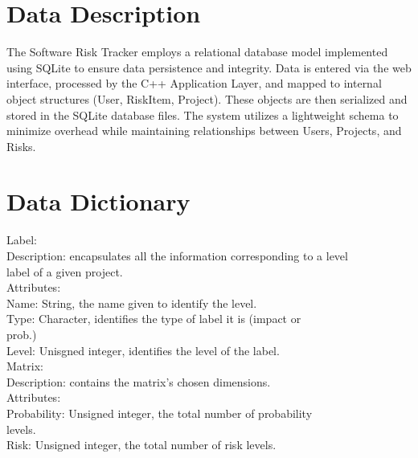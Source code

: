 \documentclass[letterpaper,12pt,oneside,listof=totoc,parskip=full]{scrreprt}
\begin{document}
\section{Data Description}

The Software Risk Tracker employs a relational database model implemented using SQLite to ensure data persistence and integrity. Data is entered via the web interface, processed by the C++ Application Layer, and mapped to internal object structures (User, RiskItem, Project). These objects are then serialized and stored in the SQLite database files. The system utilizes a lightweight schema to minimize overhead while maintaining relationships between Users, Projects, and Risks.

\section{Data Dictionary}


Label: \\
\hspace* {1cm} Description: encapsulates all the information corresponding to a level \\
\hspace*{1cm} label of a given project. \\
\hspace* {1cm} Attributes: \\
\hspace*{2cm} Name: String, the name given to identify the level. \\
\hspace*{2cm} Type: Character, identifies the type of label it is (impact or \\
\hspace*{2cm} prob.) \\
\hspace*{2cm} Level: Unisgned integer, identifies the level of the label. \\



Matrix: \\
\hspace* {1cm} Description: contains the matrix's chosen dimensions. \\
\hspace* {1cm} Attributes: \\
\hspace*{2cm} Probability: Unsigned integer, the total number of probability \\
\hspace*{2cm} levels.\\
\hspace*{2cm} Risk: Unsigned integer, the total number of risk levels. \\ 
\end{document}
